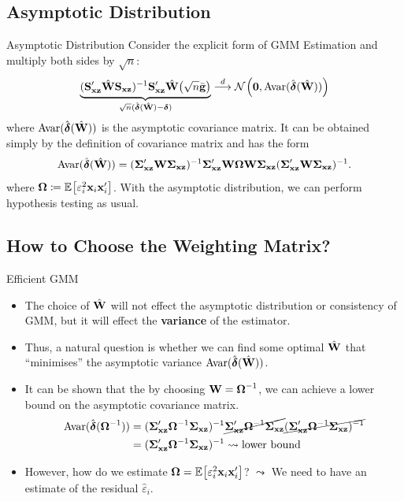\documentclass{beamer}
\begin{document}
\subsection{Asymptotic Distribution}

\begin{frame}{Asymptotic Distribution}
	Consider the explicit form of GMM Estimation and multiply
	both sides by $\sqrt{n}$:
	\begin{align*}
		\underbrace{(\mathbf{S}_{\mathbf{x}\mathbf{z}}'\hat{\mathbf{W}}\mathbf{S}_{\mathbf{x}\mathbf{z}})^{-1}\mathbf{S}_{\mathbf{x}\mathbf{z}}'\hat{\mathbf{W}}\big(\sqrt{n}\bar{\mathbf{g}}\big)}
		_{\sqrt{n}(\hat{\boldsymbol{\delta}}(\hat{\mathbf{W}}) - \boldsymbol{\delta})}
		\overset{d}{\longrightarrow} \mathcal{N}_{}\left(\mathbf{0},\mathrm{Avar}(\hat{\boldsymbol{\delta}}(\hat{\mathbf{W}}))\right)
	\end{align*}
	where $\mathrm{Avar}(\hat{\boldsymbol{\delta}}(\hat{\mathbf{W}}))$ is the asymptotic covariance matrix.
	It can be obtained simply by the definition of covariance matrix and has the form
	\begin{align*}
		\mathrm{Avar}(\hat{\boldsymbol{\delta}}(\hat{\mathbf{W}}))
		= (\boldsymbol{\Sigma}_{\mathbf{x}\mathbf{z}}'\mathbf{W}\boldsymbol{\Sigma}_{\mathbf{x}\mathbf{z}})^{-1}
		\boldsymbol{\Sigma}_{\mathbf{x}\mathbf{z}}'\mathbf{W}\boldsymbol{\Omega}\mathbf{W}\boldsymbol{\Sigma}_{\mathbf{x}\mathbf{z}}
		(\boldsymbol{\Sigma}_{\mathbf{x}\mathbf{z}}'\mathbf{W}\boldsymbol{\Sigma}_{\mathbf{x}\mathbf{z}})^{-1}.
	\end{align*}
	where $\boldsymbol{\Omega}\coloneqq\operatorname{\mathbb{E}}_{}\!\left[\varepsilon_i^2\mathbf{x}_i\mathbf{x}_i'\right]$.
	With the asymptotic distribution,
	we can perform hypothesis testing as usual.
\end{frame}

\subsection{How to Choose the Weighting Matrix?}

\begin{frame}{Efficient GMM}
	\begin{itemize}
		\item
			The choice of $\hat{\mathbf{W}}$ will not effect the asymptotic
			distribution or consistency of GMM, but it will effect the
			\textbf{variance} of the estimator.
		\item
			Thus, a natural question is whether we can find some optimal
			$\hat{\mathbf{W}}$ that ``minimises'' the asymptotic variance
			$\mathrm{Avar}(\hat{\boldsymbol{\delta}}(\hat{\mathbf{W}}))$.
		\item
			It can be shown that the by choosing $\mathbf{W}=\boldsymbol{\Omega}^{-1}$,
			we can achieve a lower bound on the asymptotic covariance matrix.
			\begin{align*}
				\mathrm{Avar}(\hat{\boldsymbol{\delta}}(\boldsymbol{\Omega}^{-1}))
				&= (\boldsymbol{\Sigma}_{\mathbf{x}\mathbf{z}}'\boldsymbol{\Omega}^{-1}\boldsymbol{\Sigma}_{\mathbf{x}\mathbf{z}})^{-1}
				\cancel{\boldsymbol{\Sigma}_{\mathbf{x}\mathbf{z}}'\boldsymbol{\Omega}^{-1}\boldsymbol{\Sigma}_{\mathbf{x}\mathbf{z}}}
				\cancel{(\boldsymbol{\Sigma}_{\mathbf{x}\mathbf{z}}'\boldsymbol{\Omega}^{-1}\boldsymbol{\Sigma}_{\mathbf{x}\mathbf{z}})^{-1}} \\
				&= (\boldsymbol{\Sigma}_{\mathbf{x}\mathbf{z}}'\boldsymbol{\Omega}^{-1}\boldsymbol{\Sigma}_{\mathbf{x}\mathbf{z}})^{-1}
				\leadsto\text{lower bound}
			\end{align*}
		\item However, how do we estimate $\boldsymbol{\Omega}=\operatorname{\mathbb{E}}_{}\!\left[\varepsilon_i^2\mathbf{x}_i\mathbf{x}_i'\right]$?
			$\leadsto$ We need to have an estimate of the residual $\hat{\varepsilon}_i$.
	\end{itemize}
\end{frame}
\end{document}
